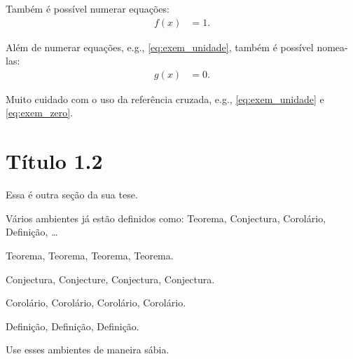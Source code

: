 Tamb\'{e}m \'{e} possível numerar equa\c{c}\~{o}es:
\begin{align}
    f(x) &= 1.
    \label{eq:exem_unidade}
\end{align}

Al\'{e}m de numerar equa\c{c}\~{o}es, e.g., \eqref{eq:exem_unidade}, tamb\'{e}m \'{e}
possível nomea-las:
\begin{align}
    g(x) &= 0.
    \tag{EIN}
    \label{eq:exem_zero}
\end{align}

Muito cuidado com o uso da refer\^{e}ncia cruzada, e.g.,
\eqref{eq:exem_unidade} e \eqref{eq:exem_zero}.

\section{Título 1.2}
Essa \'{e} outra se\c{c}\~{a}o da sua tese.

Vários ambientes já est\~{a}o definidos como: Teorema, Conjectura, Corolário,
Defini\c{c}\~{a}o, \ldots

\begin{thm}
Teorema, Teorema, Teorema, Teorema.
\end{thm}

\begin{con}
Conjectura, Conjecture, Conjectura, Conjectura.
\end{con}

\begin{cor}
Corolário, Corolário, Corolário, Corolário.
\end{cor}

\begin{dfn}
Defini\c{c}\~{a}o, Defini\c{c}\~{a}o, Defini\c{c}\~{a}o.
\end{dfn}

Use esses ambientes de maneira sábia.
